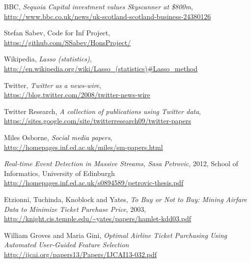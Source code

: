 \documentclass[minf,frontabs,twoside,singlespacing,parskip]{infthesis}
\begin{document}
\begin{thebibliography}{10}

	BBC, \emph{Sequoia Capital investment values Skyscanner at \$800m}, \\
	{\url{http://www.bbc.co.uk/news/uk-scotland-scotland-business-24380126}}

	Stefan Sabev, Code for Inf Project,\\
	{\url{https://github.com/SSabev/HonsProject/}}
	
	Wikipedia, \emph{Lasso (statistics)}, \\
	{\url{http://en.wikipedia.org/wiki/Lasso_(statistics)#Lasso_method}}
	
	Twitter, \emph{Twitter as a news-wire}, \\
	{\url{https://blog.twitter.com/2008/twitter-news-wire}}

	Twitter Research,
	\emph{A collection of publications using Twitter data}, \\
 	{\url{https://sites.google.com/site/twitterresearch09/twitter-papers}}

	Miles Osborne, \emph{Social media papers}, \\
	{\url{http://homepages.inf.ed.ac.uk/miles/sm-papers.html}}
	
  	\emph{Real-time Event Detection in Massive Streams, Sasa Petrovic}, 2012, School of Informatics, University of Edinburgh \\
	{\url{http://homepages.inf.ed.ac.uk/s0894589/petrovic-thesis.pdf}}
  
  
 	Etzionni, Tuchinda, Knoblock and Yates, \emph{To Buy or Not to Buy: Mining Airfare Data to Minimize Ticket Purchase Price}, 2003, \\
  	{\url{http://knight.cis.temple.edu/~yates/papers/hamlet-kdd03.pdf}}
	
	William Groves and Maria Gini, \emph{Optimal Airline Ticket Purchasing Using Automated User-Guided Feature Selection}
	{\url{http://ijcai.org/papers13/Papers/IJCAI13-032.pdf}}


\end{thebibliography}
\end{document}
